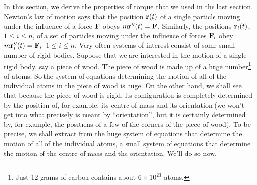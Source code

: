 In this section, we derive the properties of torque that we used in 
the last section. Newton's law of motion says that the position $\mathbf{r}(t)$ 
of a single particle moving under the influence
of a force $\mathbf{F}$ obeys $m\mathbf{r}''(t)=\mathbf{F}$. Similarly, the positions $\mathbf{r}_i(t)$, 
$1\le i\le n$, of a set of particles moving under the influence
of forces $\mathbf{F}_i$ obey $m\mathbf{r}_i''(t)=\mathbf{F}_i$, $1\le i\le n$. Very often 
systems of interest consist
of some small number of rigid bodies. Suppose that we are interested in
the motion of a single rigid body, say a piece of wood. The piece of wood
is made up of a huge number\footnote{Just 12 grams of carbon contains
about $6\times 10^{23}$ atoms.} of atoms. So the system of equations 
determining the motion of all of the individual atoms in the piece of 
wood is huge. On the other hand, we shall see that because the piece of 
wood is rigid, its configuration is completely determined by the 
position of, for example, its centre of mass and its orientation 
(we won't get into what precisely is meant by ``orientation'', but 
it is certainly determined by, for example, the positions of a few 
of the corners of the piece of wood). 
To be precise, we shall extract from the  huge system of equations 
that determine the motion of all of the individual atoms, a 
small system of equations that determine the motion of the centre of mass 
and the orientation. We'll do so now.

